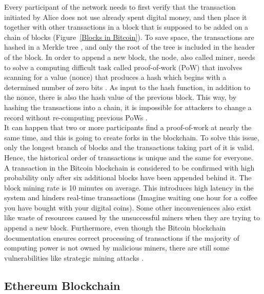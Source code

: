 Every participant of the network needs to first verify that the transaction initiated by Alice does not use already spent digital money, and then place it together with other transactions in a block that is supposed to be added on a chain of blocks (Figure~\ref{Blocks in Bitcoin}). To save space, the transactions are hashed in a Merkle tree \cite{Merkle}, and only the root of the tree is included in the header of the block. In order to append a new block, the node, also called miner, needs to solve a computing difficult task called proof-of-work (PoW) that involves scanning for a value (nonce) that produces a hash which begins with a determined number of zero bits \cite{Bitcoin}. As input to the hash function, in addition to the nonce, there is also the hash value of the previous block. This way, by hashing the transactions into a chain, it is impossible for attackers to change a record without re-computing previous PoWs \cite{Bitcoin}.\\
\newline
It can happen that two or more participants find a proof-of-work at
nearly the same time, and this is going to create forks in the blockchain.
To solve this issue, only the longest branch of blocks and the transactions taking part of it is valid. Hence, the historical order of transactions is unique and the same for everyone.\\
\newline
A transaction in the Bitcoin blockchain is considered to be confirmed with high
probability only after six additional blocks have been appended behind it. The block mining rate is 10 minutes on average. This introduces high latency in the system and hinders real-time transactions (Imagine waiting one hour for a coffee you have bought with your digital coins). 
\newline
Some other inconveniences also exist like waste of resources caused by the unsuccessful miners when they are trying to append a new block. Furthermore, even though the Bitcoin blockchain documentation \cite{Bitcoin} ensures correct processing of transactions if the majority of computing power is not owned by malicious miners, there are still some vulnerabilities like strategic mining attacks \cite{Attacks1,Attacks2}.

\subsection{Ethereum Blockchain}

